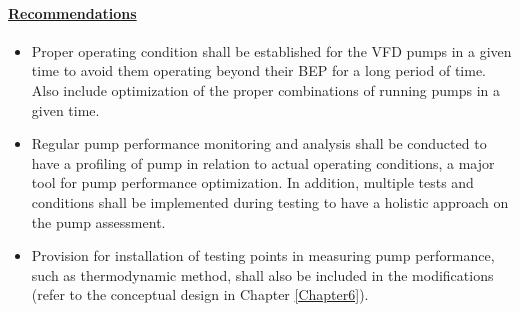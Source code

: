 

\paragraph{\underline{Recommendations}}

\begin{itemize}
\item	Proper operating condition shall be established for the VFD pumps in a given time to avoid them operating beyond their BEP for a long period of time. Also include optimization of the proper combinations of running pumps in a given time.
\item	Regular pump performance monitoring and analysis shall be conducted to have a profiling of pump in relation to actual operating conditions, a major tool for pump performance optimization. In addition, multiple tests and conditions shall be implemented during testing to have a holistic approach on the pump assessment.
\item	Provision for installation of testing points in measuring pump performance, such as thermodynamic method, shall also be included in the modifications  (refer to the conceptual design in Chapter \ref{Chapter6}).
\end{itemize}


